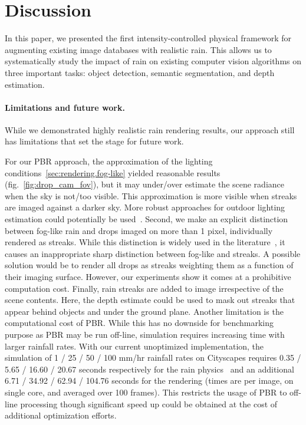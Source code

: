 \section{Discussion}

In this paper, we presented the first intensity-controlled physical framework for augmenting existing image databases with realistic rain. This allows us to systematically study the impact of rain on existing computer vision algorithms on three important tasks: object detection, semantic segmentation, and depth estimation. 

\paragraph{Limitations and future work.}

While we demonstrated highly realistic rain rendering results, our approach still has limitations that set the stage for future work. 

For our PBR approach, the approximation of the lighting conditions~\ref{sec:rendering.fog-like} yielded reasonable results (fig.~\ref{fig:drop_cam_fov}), but it may under/over estimate the scene radiance when the sky is not/too visible. This approximation is more visible when streaks are imaged against a darker sky. More robust approaches for outdoor lighting estimation could potentially be used~\cite{holdgeoffroy-cvpr-19,zhang-cvpr-19}. 
Second, we make an explicit distinction between fog-like rain and drops imaged on more than 1 pixel, individually rendered as streaks. While this distinction is widely used in the literature~\cite{garg2007vision,garg2005does,de2012fast,Li_2018_ECCV}, it causes an inappropriate sharp distinction between fog-like and streaks. A possible solution would be to render all drops as streaks weighting them as a function of their imaging surface. However, our experiments show it comes at a prohibitive computation cost. 
Finally, rain streaks are added to image irrespective of the scene contents. Here, the depth estimate could be used to mask out streaks that appear behind objects and under the ground plane.
Another limitation is the computational cost of PBR. While this has no downside for benchmarking purpose as PBR may be run off-line, simulation requires increasing time with larger rainfall rates. With our current unoptimized implementation, the simulation of 1 / 25 / 50 / 100 mm/hr rainfall rates on Cityscapes requires 0.35 / 5.65 / 16.60 / 20.67 seconds respectively for the rain physics~\cite{de2012fast} and an additional 6.71 / 34.92 / 62.94 / 104.76 seconds for the rendering (times are per image, on single core, and averaged over 100 frames).
This restricts the usage of PBR to off-line processing though significant speed up could be obtained at the cost of additional optimization efforts.

